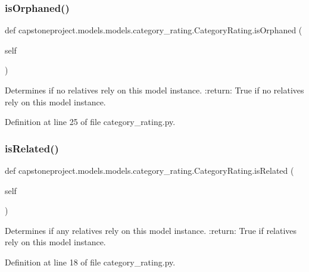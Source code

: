 \subsubsection{\texorpdfstring{is\+Orphaned()}{isOrphaned()}}
{\footnotesize\ttfamily def capstoneproject.\+models.\+models.\+category\+\_\+rating.\+Category\+Rating.\+is\+Orphaned (\begin{DoxyParamCaption}\item[{}]{self }\end{DoxyParamCaption})}

\begin{DoxyVerb}Determines if no relatives rely on this model instance.
:return: True if no relatives rely on this model instance.
\end{DoxyVerb}
 

Definition at line 25 of file category\+\_\+rating.\+py.

\mbox{\label{classcapstoneproject_1_1models_1_1models_1_1category__rating_1_1_category_rating_a0afae26c13f68f41b87ac049236f18b0}} 
\subsubsection{\texorpdfstring{is\+Related()}{isRelated()}}
{\footnotesize\ttfamily def capstoneproject.\+models.\+models.\+category\+\_\+rating.\+Category\+Rating.\+is\+Related (\begin{DoxyParamCaption}\item[{}]{self }\end{DoxyParamCaption})}

\begin{DoxyVerb}Determines if any relatives rely on this model instance.
:return: True if relatives rely on this model instance.
\end{DoxyVerb}
 

Definition at line 18 of file category\+\_\+rating.\+py.



